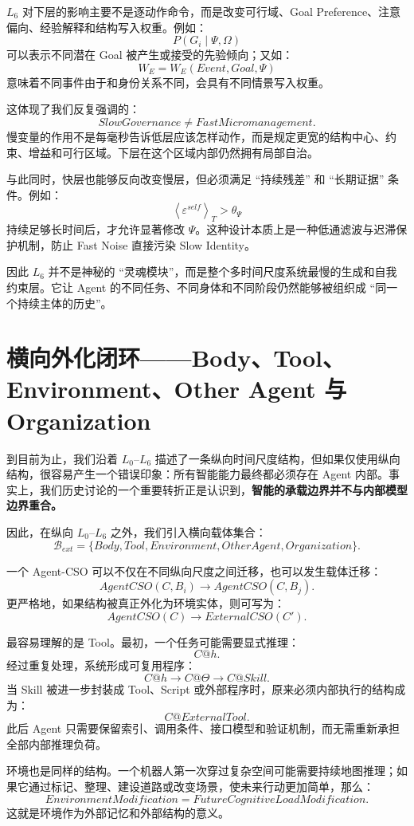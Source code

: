 $L_6$ 对下层的影响主要不是逐动作命令，而是改变可行域、Goal Preference、注意偏向、经验解释和结构写入权重。例如：
\[
P(G_i\mid\Psi,\Omega)
\]
可以表示不同潜在 Goal 被产生或接受的先验倾向；又如：
\[
W_E
=
W_E
\left(
Event,
Goal,
\Psi
\right)
\]
意味着不同事件由于和身份关系不同，会具有不同情景写入权重。

这体现了我们反复强调的：
\[
\boxed{
SlowGovernance\neq FastMicromanagement.
}
\]
慢变量的作用不是每毫秒告诉低层应该怎样动作，而是规定更宽的结构中心、约束、增益和可行区域。下层在这个区域内部仍然拥有局部自治。

与此同时，快层也能够反向改变慢层，但必须满足 ``持续残差'' 和 ``长期证据'' 条件。例如：
\[
\left\langle
\varepsilon^{self}
\right\rangle_T
>
\theta_\Psi
\]
持续足够长时间后，才允许显著修改 $\Psi$。这种设计本质上是一种低通滤波与迟滞保护机制，防止 Fast Noise 直接污染 Slow Identity。

因此 $L_6$ 并不是神秘的 ``灵魂模块''，而是整个多时间尺度系统最慢的生成和自我约束层。它让 Agent 的不同任务、不同身体和不同阶段仍然能够被组织成 ``同一个持续主体的历史''。

\section{横向外化闭环——Body、Tool、Environment、Other Agent 与 Organization}

到目前为止，我们沿着 $L_0$--$L_6$ 描述了一条纵向时间尺度结构，但如果仅使用纵向结构，很容易产生一个错误印象：所有智能能力最终都必须存在 Agent 内部。事实上，我们历史讨论的一个重要转折正是认识到，\textbf{智能的承载边界并不与内部模型边界重合。}

因此，在纵向 $L_0$--$L_6$ 之外，我们引入横向载体集合：
\[
\mathcal B_{ext}
=
\{
Body,
Tool,
Environment,
OtherAgent,
Organization
\}.
\]

一个 Agent-CSO 可以不仅在不同纵向尺度之间迁移，也可以发生载体迁移：
\[
AgentCSO(C,B_i)
\rightarrow
AgentCSO(C,B_j).
\]
更严格地，如果结构被真正外化为环境实体，则可写为：
\[
AgentCSO(C)
\rightarrow
ExternalCSO(C').
\]

最容易理解的是 Tool。最初，一个任务可能需要显式推理：
\[
C@h.
\]
经过重复处理，系统形成可复用程序：
\[
C@h
\rightarrow
C@\Theta
\rightarrow
C@Skill.
\]
当 Skill 被进一步封装成 Tool、Script 或外部程序时，原来必须内部执行的结构成为：
\[
C@ExternalTool.
\]
此后 Agent 只需要保留索引、调用条件、接口模型和验证机制，而无需重新承担全部内部推理负荷。

环境也是同样的结构。一个机器人第一次穿过复杂空间可能需要持续地图推理；如果它通过标记、整理、建设道路或改变场景，使未来行动更加简单，那么：
\[
\boxed{
EnvironmentModification
=
FutureCognitiveLoadModification.
}
\]
这就是环境作为外部记忆和外部结构的意义。

